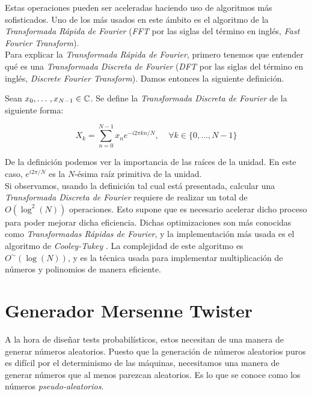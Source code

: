 Estas operaciones pueden ser aceleradas haciendo uso de algoritmos más sofisticados. Uno de los más usados en este ámbito es el algoritmo de la \textit{Transformada Rápida de Fourier} (\textit{FFT} por las siglas del término en inglés, \textit{Fast Fourier Transform}).\\

Para explicar la \textit{Transformada Rápida de Fourier}, primero tenemos que entender qué es una \textit{Transformada Discreta de Fourier} (\textit{DFT} por las siglas del término en inglés, \textit{Discrete Fourier Transform}). Damos entonces la siguiente definición.

\begin{definicion}
	Sean $x_0,\dotso,x_{N-1} \in \mathbb{C}$. Se define la \textit{Transformada Discreta de Fourier} de la siguiente forma:
	
	\begin{equation}
	X_k = \sum_{n=0}^{N-1}x_ne^{-i2\pi kn / N},\;\;\;\;\forall k \in \{0,\dotso,N-1\}
	\end{equation}
\end{definicion}

De la definición podemos ver la importancia de las raíces de la unidad. En este caso, $e^{i2\pi/N}$ es la $N$-ésima raíz primitiva de la unidad.\\

Si observamos, usando la definición tal cual está presentada, calcular una \textit{Transformada Discreta de Fourier} requiere de realizar un total de $O(\log^2(N))$ operaciones. Esto supone que es necesario acelerar dicho proceso para poder mejorar dicha eficiencia. Dichas optimizaciones son más conocidas como \textit{Transformadas Rápidas de Fourier}, y la implementación más usada es el algoritmo de \textit{Cooley-Tukey} \cite{cooley_tukey_1969}. La complejidad de este algoritmo es $O^\sim(\log(N))$, y es la técnica usada para implementar multiplicación de números y polinomios de manera eficiente.

\section{Generador Mersenne Twister}

A la hora de diseñar tests probabilísticos, estos necesitan de una manera de generar números aleatorios. Puesto que la generación de números aleatorios puros es difícil por el determinismo de las máquinas, necesitamos una manera de generar números que al menos parezcan aleatorios. Es lo que se conoce como los números \textit{pseudo-aleatorios}.\\

